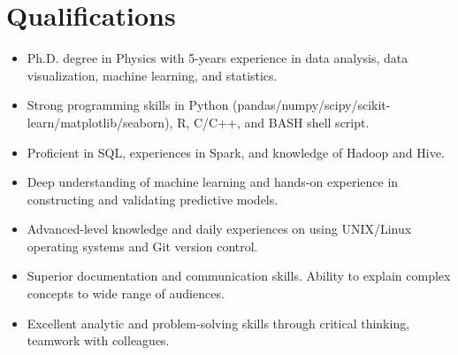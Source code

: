 \documentclass[11pt, letterpaper]{yt_resume}   	%
\begin{document}

\header


\section{Qualifications}

\begin{itemize}
\item Ph.D. degree in Physics with 5-years experience in data analysis, data visualization, machine learning, and statistics.
\item Strong programming skills in Python (pandas/numpy/scipy/scikit-learn/matplotlib/seaborn), R,  C/C++, and BASH shell script.
\item Proficient in SQL, experiences in Spark, and knowledge of Hadoop and Hive.
\item Deep understanding of machine learning and hands-on experience in constructing and validating predictive models.
\item Advanced-level knowledge and daily experiences on using UNIX/Linux operating systems and Git version control.
\item Superior documentation and communication skills.
Ability to explain complex concepts to wide range of audiences.
\item Excellent analytic and problem-solving skills through critical thinking, teamwork with colleagues.
\end{itemize}


\end{document}
